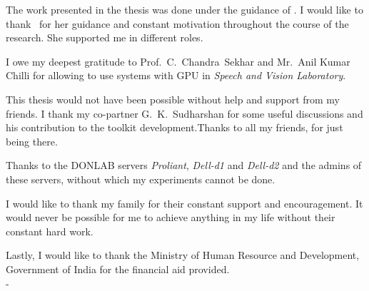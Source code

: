 \acknowledgements
The work presented in the thesis was done under the guidance of \thesisguide.  I would like to thank \thesisguide ~for her guidance  and constant motivation throughout the course of the research.  She supported me in different roles.

I owe my deepest gratitude to Prof.~C.~Chandra~Sekhar and Mr.~Anil Kumar Chilli for allowing to use systems with GPU in {\it Speech and Vision Laboratory}.


This thesis would not have been possible without help and support from my friends.  I thank my co-partner G.~K.~Sudharshan for some useful discussions and his contribution to the toolkit development.Thanks to all my friends, for just being there.

Thanks to the DONLAB servers \textit{Proliant}, \textit{Dell-d1} and \textit{Dell-d2} and the admins of these servers, without which my experiments cannot be done.

I would like to thank my family for their constant support and encouragement.  It would never be possible for me to achieve anything in my life without their constant hard work.

Lastly, I would like to thank the Ministry of Human Resource and Development, Government of India for the financial aid provided.\\

\hfill - \thesisauthor
